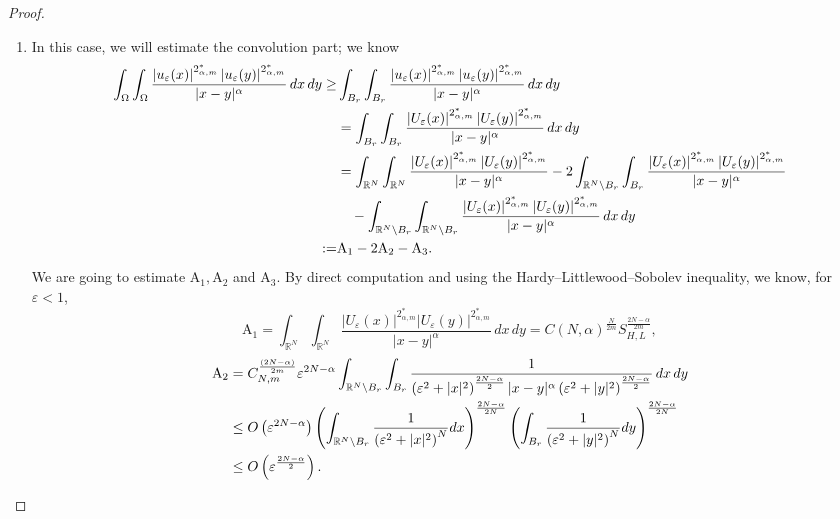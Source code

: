 \documentclass[reqno]{amsart}
\newcommand{\eps}{\varepsilon}
\newcommand{\Om}{\Omega}
\newcommand{\al} {\alpha}
\newcommand{\noi} {  \noindent}
\newcommand{\mb} {\mathbb}
\numberwithin{theorem}{section} \numberwithin{equation}{section}
\begin{document}
\begin{proof}
\begin{enumerate}
\item  In this case, we will estimate the convolution part; we know
 \begin{align}\label{e45}
\int_{\Om} \int_{\Om} \frac{\left|u_{\eps}(x)\right|^{2_{\al, m}^*}\left|u_{\eps}(y)\right|^{2_{\al, m}^*}}{|x-y|^\al} \, dx \, dy \geq & \int_{B_r} \int_{B_r} \frac{\left|u_{\eps}(x)\right|^{2_{\al, m}^*}\left|u_{\eps}(y)\right|^{2_{\al, m}^*}}{|x-y|^\al} \, d x \, d y \notag\\
&= \int_{B_r} \int_{B_r} \frac{\left|U_{\eps}(x)\right|^{2_{\al, m}^*}\left|U_{\eps}(y)\right|^{2_{\al, m}^*}}{|x-y|^\al} \, dx \, dy \notag\\
& =\int_{\mb{R}^N} \int_{\mb{R}^N} \frac{\left|U_{\eps}(x)\right|^{2_{\al, m}^*}\left|U_{\eps}(y)\right|^{2_{\al, m}^*}}{|x-y|^\al}-2 \int_{\mb{R}^N \backslash B_r}\int_{B_r} \frac{\left|U_{\eps}(x)\right|^{2_{\al, m}^*}\left|U_{\eps}(y)\right|^{2_{\al, m}^*}}{|x-y|^\al} \notag\\
& \quad -\int_{\mb{R}^N \backslash B_r}\int_{\mb{R}^N \backslash B_r} \frac{\left|U_{\eps}(x)\right|^{2_{\al, m}^*}\left|U_{\eps}(y)\right|^{2_{\al, m}^*}}{|x-y|^\al} \, dx \, dy \\
:= & \mathrm{A_1}-2 \mathrm{A_2}-\mathrm{A_3}.\notag
\end{align}
\noi We are going to estimate $\mathrm{A_1}, \mathrm{A_2}$ and $\mathrm{A_3}$. By direct computation and using the Hardy--Littlewood--Sobolev inequality, we know, for $\eps<1$,
\begin{equation*}
\mathrm{A_1}=\int_{\mb{R}^N} \int_{\mb{R}^N} \frac{\left|U_{\eps}(x)\right|^{2_{\al, m}^*}\left|U_{\eps}(y)\right|^{2_{\al, m}^*}}{|x-y|^\al}\, dx \, dy = C(N, \al)^{\frac{N}{2m}} S_{H, L}^{\frac{2N-\al}{2m}},
\end{equation*}
\begin{align*}
\mathrm{A_2} &=C_{N, m}^{\frac{(2N-\al)}{2m}}\eps^{2N-\al}
\int_{\mb{R}^N \setminus B_r} \int_{B_r}
\frac{1}{\left(\eps^2+|x|^2\right)^{\frac{2N-\al}{2}}
|x-y|^\al
\left(\eps^2+|y|^2\right)^{\frac{2N-\al}{2}}}\, dx \, dy \notag\\
& \leq O\left(\eps^{2N-\al}\right)\left(\int_{\mb{R}^N \setminus B_r} \frac{1}{\left(\eps^2+|x|^2\right)^{N}} d x\right)^{\frac{2N-\al}{2N}}\left(\int_{B_r} \frac{1}{\left(\eps^2+|y|^2\right)^{N}} d y\right)^{\frac{2N-\al}{2N}}\notag \\
& \leq O\left(\eps^{\frac{2N-\al}{2}}\right).
\end{align*}

\end{enumerate}
\end{proof}
\end{document}
